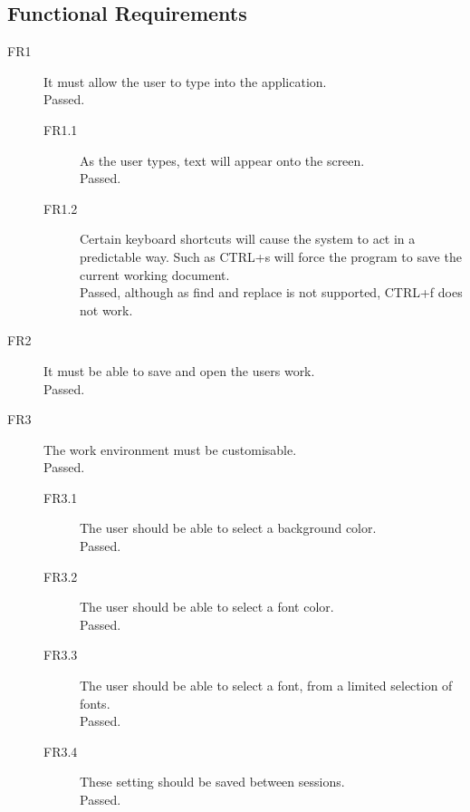 \documentclass[10pt]{article}
\begin{document}
\subsection{Functional Requirements}

\begin{description}

   \item[FR1] It must allow the user to type into the application. \\ Passed.

   \begin{description}

      \item[FR1.1] As the user types, text will appear onto the screen. \\ Passed.

      \item[FR1.2] Certain keyboard shortcuts will cause the system to act in a predictable way. Such as CTRL+s will force the program to save the current working document. \\ Passed, although as find and replace is not supported, CTRL+f does not work.

   \end{description}

   \item[FR2] It must be able to save and open the users work. \\ Passed.

   \item[FR3] The work environment must be customisable. \\ Passed.

   \begin{description}

      \item[FR3.1] The user should be able to select a background color. \\ Passed.

      \item[FR3.2] The user should be able to select a font color. \\ Passed.

      \item[FR3.3] The user should be able to select a font, from a limited selection of fonts. \\ Passed.

      \item[FR3.4] These setting should be saved between sessions. \\ Passed.


\end{description}
\end{description}
\end{document}
